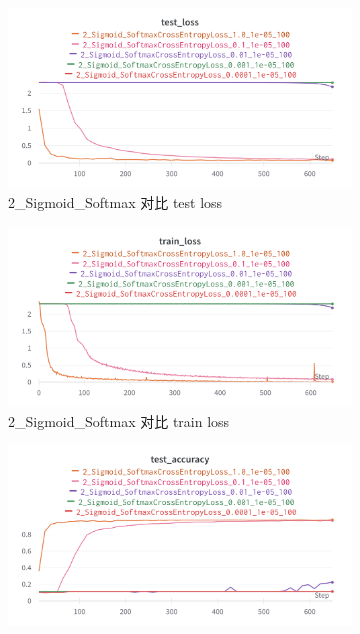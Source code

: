 \documentclass{article}
\begin{document}
\begin{figure}[htbp]
	\centering
	\begin{subfigure}{0.475\textwidth}
		\centering
		\includegraphics[width=1\textwidth]{../pics/学习率_2_Sigmoid_Softmax_test_loss.png}
		\caption{2\_Sigmoid\_Softmax 对比 test loss}
	\end{subfigure}
	\begin{subfigure}{0.475\textwidth}
		\centering
		\includegraphics[width=1\textwidth]{../pics/学习率_2_Sigmoid_Softmax_train_loss.png}
		\caption{2\_Sigmoid\_Softmax 对比 train loss}
	\end{subfigure}
	\begin{subfigure}{0.475\textwidth}
		\centering
		\includegraphics[width=1\textwidth]{../pics/学习率_2_Sigmoid_Softmax_test_acc.png}

\end{subfigure}
\end{figure}
\end{document}
